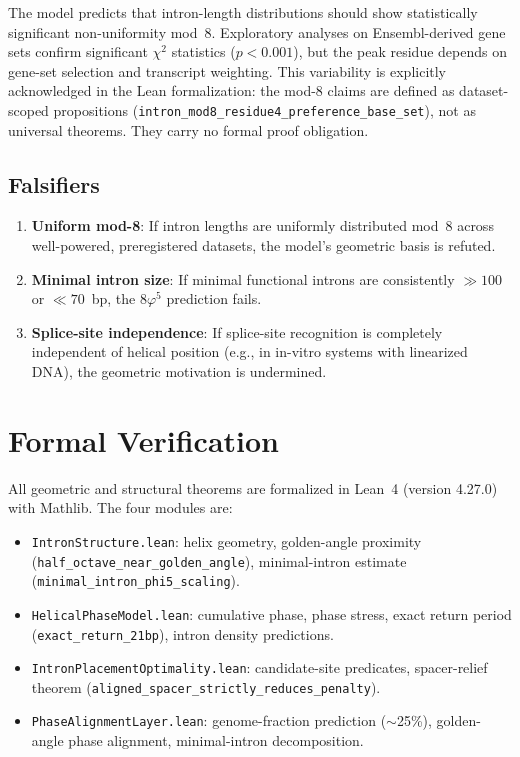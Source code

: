 \documentclass[11pt,twocolumn]{article}
\begin{document}
The model predicts that intron-length distributions should show
statistically significant non-uniformity mod~8. Exploratory analyses on
Ensembl-derived gene sets confirm significant $\chi^2$ statistics
($p < 0.001$), but the peak residue depends on gene-set selection and
transcript weighting. This variability is explicitly acknowledged in the
Lean formalization: the mod-8 claims are defined as dataset-scoped
propositions (\texttt{intron\_mod8\_residue4\_preference\_base\_set}), not
as universal theorems. They carry no formal proof obligation.

\subsection{Falsifiers}

\begin{enumerate}
\item \textbf{Uniform mod-8}: If intron lengths are uniformly distributed
  mod~8 across well-powered, preregistered datasets, the model's geometric
  basis is refuted.
\item \textbf{Minimal intron size}: If minimal functional introns are
  consistently $\gg 100$ or $\ll 70$~bp, the $8\varphi^5$ prediction
  fails.
\item \textbf{Splice-site independence}: If splice-site recognition is
  completely independent of helical position (e.g., in in-vitro systems
  with linearized DNA), the geometric motivation is undermined.
\end{enumerate}

\section{Formal Verification}

All geometric and structural theorems are formalized in Lean~4
(version 4.27.0) with Mathlib. The four modules are:

\begin{itemize}
\item \texttt{IntronStructure.lean}: helix geometry, golden-angle
  proximity (\texttt{half\_octave\_near\_golden\_angle}), minimal-intron
  estimate (\texttt{minimal\_intron\_phi5\_scaling}).
\item \texttt{HelicalPhaseModel.lean}: cumulative phase, phase stress,
  exact return period (\texttt{exact\_return\_21bp}), intron density
  predictions.
\item \texttt{IntronPlacementOptimality.lean}: candidate-site predicates,
  spacer-relief theorem
  (\texttt{aligned\_spacer\_strictly\_reduces\_penalty}).
\item \texttt{PhaseAlignmentLayer.lean}: genome-fraction prediction
  ($\sim$25\%), golden-angle phase alignment, minimal-intron
  decomposition.
\end{itemize}
\end{document}
